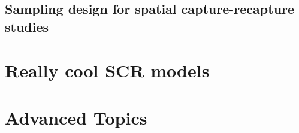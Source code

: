 \documentclass{book}
\begin{document}


%
\chapter{Sampling design for spatial capture-recapture studies }


\part{Really cool SCR models}

















\part{Advanced Topics}





















\end{document}
